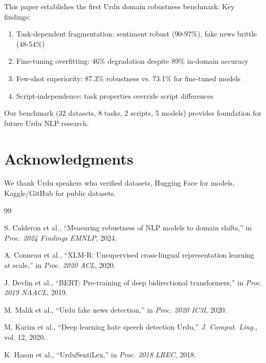 \documentclass[10pt,twocolumn,journal]{IEEEtran}
\begin{document}
This paper establishes the first Urdu domain robustness benchmark. Key findings:

\begin{enumerate}
\item Task-dependent fragmentation: sentiment robust (90-97\%), fake news brittle (48-54\%)
\item Fine-tuning overfitting: 46\% degradation despite 89\% in-domain accuracy
\item Few-shot superiority: 87.3\% robustness vs. 73.1\% for fine-tuned models
\item Script-independence: task properties override script differences
\end{enumerate}

Our benchmark (32 datasets, 8 tasks, 2 scripts, 5 models) provides foundation for future Urdu NLP research.

\section*{Acknowledgments}

We thank Urdu speakers who verified datasets, Hugging Face for models, Kaggle/GitHub for public datasets.

\begin{thebibliography}{99}

 S. Calderon et al., ``Measuring robustness of NLP models to domain shifts,'' in \emph{Proc. 2024 Findings EMNLP}, 2024.

 A. Conneau et al., ``XLM-R: Unsupervised cross-lingual representation learning at scale,'' in \emph{Proc. 2020 ACL}, 2020.

 J. Devlin et al., ``BERT: Pre-training of deep bidirectional transformers,'' in \emph{Proc. 2019 NAACL}, 2019.

 M. Malik et al., ``Urdu fake news detection,'' in \emph{Proc. 2020 IC3I}, 2020.

 M. Karim et al., ``Deep learning hate speech detection Urdu,'' \emph{J. Comput. Ling.}, vol. 12, 2020.

 K. Hasan et al., ``UrduSentiLex,'' in \emph{Proc. 2018 LREC}, 2018.

\end{thebibliography}
\end{document}
